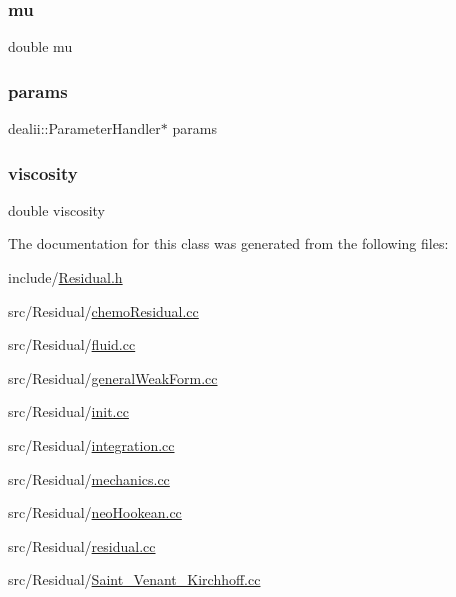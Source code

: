 \mbox{\label{class_residual_a74577585cf12d1712ab9c57616d49205}} 
\subsubsection{\texorpdfstring{mu}{mu}}
{\footnotesize\ttfamily double mu}

\mbox{\label{class_residual_accca5aede13ea52f0c11dff4daf1ad97}} 
\subsubsection{\texorpdfstring{params}{params}}
{\footnotesize\ttfamily dealii\+::\+Parameter\+Handler$\ast$ params}

\mbox{\label{class_residual_ad80875e5d1c4362e2eae93663ad723fb}} 
\subsubsection{\texorpdfstring{viscosity}{viscosity}}
{\footnotesize\ttfamily double viscosity}



The documentation for this class was generated from the following files\+:\begin{DoxyCompactItemize}
\item 
include/\mbox{\hyperlink{_residual_8h}{Residual.\+h}}\item 
src/\+Residual/\mbox{\hyperlink{chemo_residual_8cc}{chemo\+Residual.\+cc}}\item 
src/\+Residual/\mbox{\hyperlink{fluid_8cc}{fluid.\+cc}}\item 
src/\+Residual/\mbox{\hyperlink{general_weak_form_8cc}{general\+Weak\+Form.\+cc}}\item 
src/\+Residual/\mbox{\hyperlink{init_8cc}{init.\+cc}}\item 
src/\+Residual/\mbox{\hyperlink{integration_8cc}{integration.\+cc}}\item 
src/\+Residual/\mbox{\hyperlink{mechanics_8cc}{mechanics.\+cc}}\item 
src/\+Residual/\mbox{\hyperlink{neo_hookean_8cc}{neo\+Hookean.\+cc}}\item 
src/\+Residual/\mbox{\hyperlink{residual_8cc}{residual.\+cc}}\item 
src/\+Residual/\mbox{\hyperlink{_saint___venant___kirchhoff_8cc}{Saint\+\_\+\+Venant\+\_\+\+Kirchhoff.\+cc}}\end{DoxyCompactItemize}

